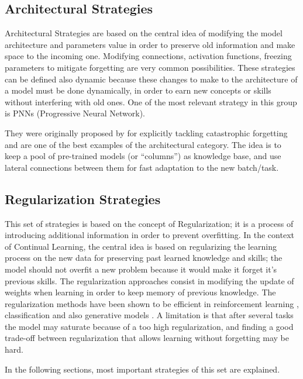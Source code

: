 \documentclass[english, LaM, oneside]{sapthesis}%
\begin{document}
\subsection{Architectural Strategies}
Architectural Strategies are based on the central idea of modifying the model architecture and parameters value in order to preserve old information and make space to the incoming one. Modifying connections, activation functions, freezing parameters to mitigate forgetting are very common possibilities. These strategies can be defined also dynamic because these changes to make to the architecture of a model must be done dynamically, in order to earn new concepts or skills without interfering with old ones. One of the most relevant strategy in this group is PNNs (Progressive Neural Network). 

They were originally proposed by \cite{rusu} for explicitly tackling catastrophic forgetting and are one of the best examples of the architectural category. The idea is to keep a pool of pre-trained models (or “columns”) as knowledge base, and use lateral connections between them for fast adaptation to the new batch/task.


\subsection{Regularization Strategies}
This set of strategies is based on the concept of Regularization; it is a process of introducing additional information in order to prevent overfitting. In the context of Continual Learning, the central idea is based on regularizing the learning process on the new data for preserving past learned knowledge and skills; the model should not overfit a new problem because it would make it forget it’s previous skills. The regularization approaches consist in modifying the update of weights when learning in order to keep memory of previous knowledge.
The regularization methods have been shown to be efficient in reinforcement learning \cite{Kirkpatrick}, classification \cite{chelsea} and also generative models . A limitation is that after several tasks the model may saturate because of a too high regularization, and finding a good trade-off between regularization that allows learning without forgetting may be hard.

In the following sections, most important strategies of this set are explained.
\end{document}
